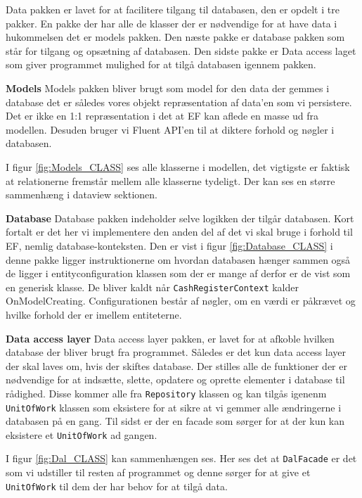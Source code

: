 Data pakken er lavet for at facilitere tilgang til databasen, den er opdelt i tre pakker. En pakke der har alle de klasser der er nødvendige for at have data i hukommelsen det er models pakken. Den næste pakke er database pakken som står for tilgang og opsætning af databasen. Den sidste pakke er Data access laget som giver programmet mulighed for at tilgå databasen igennem pakken.
\newline

\textbf{Models}\newline
Models pakken bliver brugt som model for den data der gemmes i database det er således vores objekt repræsentation af data'en som vi persistere. Det er ikke en 1:1 repræsentation i det at EF kan aflede en masse ud fra modellen. Desuden bruger vi Fluent API'en til at diktere forhold og nøgler i databasen.


I figur \ref{fig:Models_CLASS} ses alle klasserne i modellen, det vigtigste er faktisk at relationerne fremstår mellem alle klasserne tydeligt. Der kan ses en større sammenhæng i dataview sektionen.
\newline

\textbf{Database}\newline
Database pakken indeholder selve logikken der tilgår databasen. Kort fortalt er det her vi implementere den anden del af det vi skal bruge i forhold til EF, nemlig database-konteksten. 
Den er vist i figur \ref{fig:Database_CLASS} i denne pakke ligger instruktionerne om hvordan databasen hænger sammen også de ligger i entityconfiguration klassen som der er mange af derfor er de vist som en generisk klasse.
De bliver kaldt når \texttt{CashRegisterContext} kalder OnModelCreating. Configurationen består af nøgler, om en værdi er påkrævet og hvilke forhold der er imellem entiteterne. 

\textbf{Data access layer}\newline
Data access layer pakken, er lavet for at afkoble hvilken database der bliver brugt fra programmet. 
Således er det kun data access layer der skal laves om, hvis der skiftes database. 
Der stilles alle de funktioner der er nødvendige for at indsætte, slette, opdatere og oprette elementer i database til rådighed. 
Disse kommer alle fra \texttt{Repository} klassen og kan tilgås igenenm \texttt{UnitOfWork} klassen som eksistere for at sikre at vi gemmer alle ændringerne i databasen på en gang. Til sidst er der en facade som sørger for at der kun kan eksistere et \texttt{UnitOfWork} ad gangen. 


I figur \ref{fig:Dal_CLASS} kan sammenhængen ses. 
Her ses det at \texttt{DalFacade} er det som vi udstiller til resten af programmet og denne sørger for at give et \texttt{UnitOfWork} til dem der har behov for at tilgå data.
